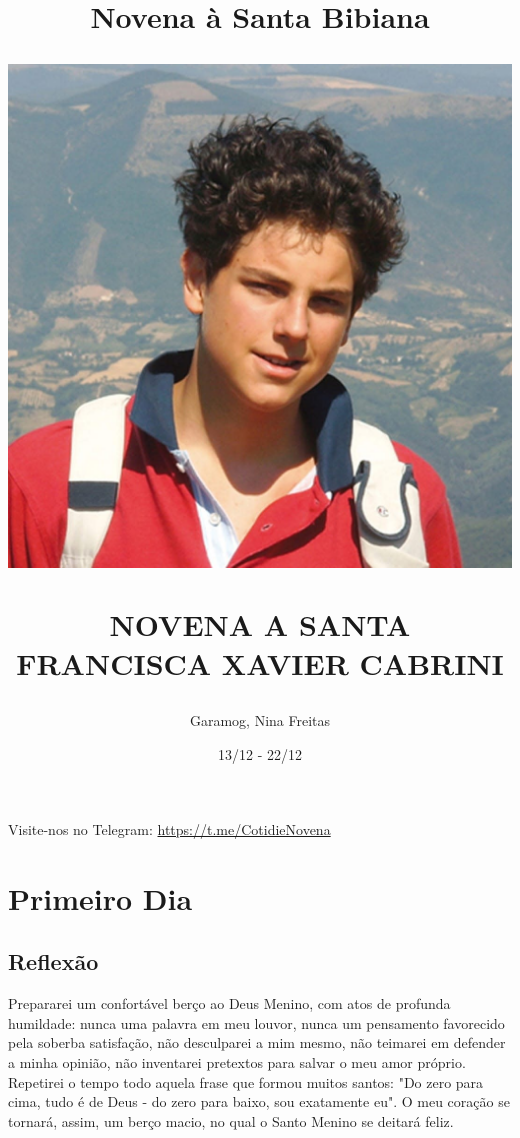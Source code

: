 \documentclass[11pt]{article}
\title{Novena à Santa Bibiana}
\title{
  \includegraphics[scale=0.23]{./assets/imagem.jpg}
  \par
   NOVENA A SANTA FRANCISCA XAVIER CABRINI }
\author{Garamog, Nina Freitas}
\date{13/12 - 22/12}
\begin{document}
\thispagestyle{empty}

\pagestyle{fancy}
\fancyhf{} %
\fancyfoot[R]{\thepage}
  
\newpage

\tableofcontents

\centering
\vfill
Visite-nos no Telegram: \url{https://t.me/CotidieNovena}
\newpage



\section{Primeiro Dia}
\subsection{Reflexão}
Prepararei um confortável berço ao Deus Menino, com atos de profunda humildade: nunca uma palavra em meu louvor, nunca um pensamento favorecido pela soberba satisfação, não desculparei a mim mesmo, não teimarei em defender a minha opinião, não inventarei pretextos para salvar o meu amor próprio. Repetirei o tempo todo aquela frase que formou muitos santos: "Do zero para cima, tudo é de Deus - do zero para baixo, sou exatamente eu". O meu coração se tornará, assim, um berço macio, no qual o Santo Menino se deitará feliz.
\end{document}
